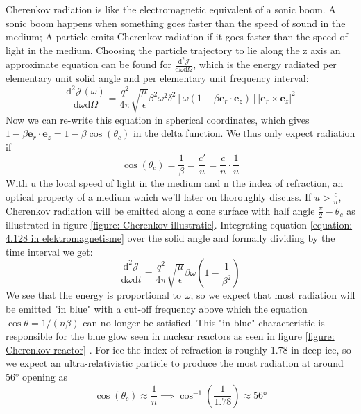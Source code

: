 Cherenkov radiation is like the electromagnetic equivalent of a sonic boom. A
sonic boom happens when something goes faster than the speed of sound in the
medium; A particle emits Cherenkov radiation if it goes faster than the speed
of light in the medium.  Choosing the particle trajectory to lie along the z
axis an approximate equation can be found\cite{jackson1998classical} for
$\frac{\text{d}^2 \mathscr{J}}{\text{d}\omega \text{d}\Omega}$, which is the energy
radiated per elementary unit solid angle and per elementary unit frequency
interval:
\begin{equation}
	\frac{\text{d}^2 \mathscr{J}(\omega)}{\text{d} \omega \text{d} \Omega} = \frac{q^2}{4\pi}\sqrt{\frac{\mu}{\epsilon}}\beta^2\omega^2\delta^2[\omega(1-\beta \mathbf{e}_r\cdot\mathbf{e}_z)]|\mathbf{e}_r\times\mathbf{e}_z|^2 \label{equation: 4.128 in elektromagnetisme}
\end{equation}
Now we can re-write this equation in spherical coordinates, which gives $1-\beta \mathbf{e}_r\cdot\mathbf{e}_z = 1-\beta\cos(\theta_c)$ in the delta function. We thus only expect radiation if
\begin{equation}
\cos(\theta_c) = \frac{1}{\beta} = \frac{c'}{u} = \frac{c}{n}\cdot\frac{1}{u}
\end{equation}
With u the local speed of light in the medium and n the index of refraction, an optical
property of a medium which we'll later on thoroughly discuss.
If $u>\frac{c}{n}$, Cherenkov radiation will
be emitted along a cone surface with half angle $\frac{\pi}{2}-\theta_c$ as
illustrated in figure \ref{figure: Cherenkov illustratie}. Integrating equation
\ref{equation: 4.128 in elektromagnetisme} over the solid angle and formally
dividing by the time interval we get:
\begin{equation}
	\frac{\text{d}^2\mathscr{J}}{\text{d}\omega \text{d}t} = \frac{q^2}{4\pi}\sqrt{\frac{\mu}{\epsilon}}\beta\omega\left(1-\frac{1}{\beta^2}\right)	
\end{equation}
We see that the energy is proportional to $\omega$, so we expect that most
radiation will be emitted "in blue" with a cut-off frequency above which the
equation $\cos\theta = 1/(n\beta)$ can no longer be satisfied. This "in blue"
characteristic is responsible for the blue glow seen in nuclear reactors as
seen in figure \ref{figure: Cherenkov reactor} .  For ice the index of
refraction is roughly 1.78 in deep ice, so we expect an ultra-relativistic
particle to produce the most radiation at around 56° opening as 
\begin{equation}
	\cos(\theta_c) \approx \frac{1}{n} \implies \cos^{-1}\left(\frac{1}{1.78}\right)\approx 56\text{°}
\end{equation}
